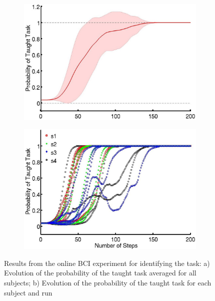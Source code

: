 \documentclass[conference]{IEEEtran}
\begin{document}
\begin{figure}[!htbp]
	\centering
		\begin{subfigure}[t]{1\columnwidth}
			\centering
   			\includegraphics[width=\columnwidth]{images/Avg_evo_likelihood.jpg}
   			\caption{} 
			\label{fig:avg_evo_real}
		\end{subfigure}
		\begin{subfigure}[t]{1\columnwidth}
			\centering
   			\includegraphics[width=\columnwidth]{images/Evo_likelihood.jpg}
   			\caption{} 
			\label{fig:subject_evo_real}
		\end{subfigure}
	\caption{\label{fig:online_results} Results from the online BCI experiment for identifying the task: a) Evolution of the probability of the taught task averaged for all subjects; b) Evolution of the probability of the taught task for each subject and run} 
\end{figure}
\end{document}
